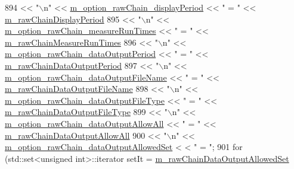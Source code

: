 \begin{DoxyCode}
894      << \textcolor{stringliteral}{"\(\backslash\)n"} << \hyperlink{class_q_u_e_s_o_1_1_m_l_sampling_level_options_ad71a6b65d66c81154cabef647419cff0}{m\_option\_rawChain\_displayPeriod}                     << \textcolor{stringliteral}{" = "}
       << \hyperlink{class_q_u_e_s_o_1_1_m_l_sampling_level_options_a6d0e080a6b428a8e6c8fed14c597c883}{m\_rawChainDisplayPeriod}
895      << \textcolor{stringliteral}{"\(\backslash\)n"} << \hyperlink{class_q_u_e_s_o_1_1_m_l_sampling_level_options_a0dab337e638625987315c34660d8846e}{m\_option\_rawChain\_measureRunTimes}                   << \textcolor{stringliteral}{" =
       "} << \hyperlink{class_q_u_e_s_o_1_1_m_l_sampling_level_options_ad93ee62195c418eedb55877009102cab}{m\_rawChainMeasureRunTimes}
896      << \textcolor{stringliteral}{"\(\backslash\)n"} << \hyperlink{class_q_u_e_s_o_1_1_m_l_sampling_level_options_a6fd76d8d884e3432274110a02f98086b}{m\_option\_rawChain\_dataOutputPeriod}                  << \textcolor{stringliteral}{"
       = "} << \hyperlink{class_q_u_e_s_o_1_1_m_l_sampling_level_options_a8fdb68e6d3e91f0334293f2ee009aded}{m\_rawChainDataOutputPeriod}
897      << \textcolor{stringliteral}{"\(\backslash\)n"} << \hyperlink{class_q_u_e_s_o_1_1_m_l_sampling_level_options_ad1d736cccbf3be64e1998c18ead26630}{m\_option\_rawChain\_dataOutputFileName}                << \textcolor{stringliteral}{
      " = "} << \hyperlink{class_q_u_e_s_o_1_1_m_l_sampling_level_options_ab89d7ed301a956f913058a8e5f63fbbd}{m\_rawChainDataOutputFileName}
898      << \textcolor{stringliteral}{"\(\backslash\)n"} << \hyperlink{class_q_u_e_s_o_1_1_m_l_sampling_level_options_a3cbc234ca24903ff9addc9a379bb69bf}{m\_option\_rawChain\_dataOutputFileType}                << \textcolor{stringliteral}{
      " = "} << \hyperlink{class_q_u_e_s_o_1_1_m_l_sampling_level_options_a239091edd94cfa694c6c33591c1d1ba2}{m\_rawChainDataOutputFileType}
899      << \textcolor{stringliteral}{"\(\backslash\)n"} << \hyperlink{class_q_u_e_s_o_1_1_m_l_sampling_level_options_a5edf0fb3329b34a79dee8d3f2187dd28}{m\_option\_rawChain\_dataOutputAllowAll}                << \textcolor{stringliteral}{
      " = "} << \hyperlink{class_q_u_e_s_o_1_1_m_l_sampling_level_options_a4e84fdd26bf87099d2b126f5fda379a6}{m\_rawChainDataOutputAllowAll}
900      << \textcolor{stringliteral}{"\(\backslash\)n"} << \hyperlink{class_q_u_e_s_o_1_1_m_l_sampling_level_options_ad7b34b44ea9dcfbf9092167bdb9d4ecb}{m\_option\_rawChain\_dataOutputAllowedSet}              <
      < \textcolor{stringliteral}{" = "};
901   \textcolor{keywordflow}{for} (std::set<unsigned int>::iterator setIt = \hyperlink{class_q_u_e_s_o_1_1_m_l_sampling_level_options_ae5c2fe5b90eda78e17ccfbf3dbcfcc89}{m\_rawChainDataOutputAllowedSet}

\end{DoxyCode}
